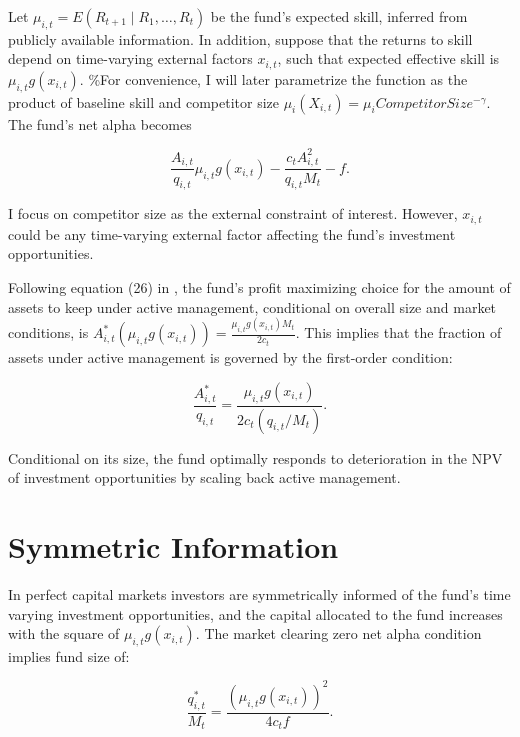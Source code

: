\documentclass[openany]{book}
\theoremstyle{definition}
\theoremstyle{definition}
\theoremstyle{definition}
\theoremstyle{remark}
\begin{document}
Let \(\mu_{i,t}=E(R_{t+1}\mid R_1,\ldots,R_t)\) be the fund's expected
skill, inferred from publicly available information. In addition,
suppose that the returns to skill depend on time-varying external
factors \(x_{i,t}\), such that expected effective skill is
\(\mu_{i,t}g(x_{i,t})\). \%For convenience, I will later parametrize the
function as the product of baseline skill and competitor size
\(\mu_i(X_{i,t})=\mu_i CompetitorSize^{-\gamma}\). The fund's net alpha
becomes

\begin{equation}
\frac{A_{i,t}}{q_{i,t}}\mu_{i,t}g(x_{i,t})-\frac{c_t A_{i,t}^2}{q_{i,t}M_t}-f. 
\end{equation}

I focus on competitor size as the external constraint of interest.
However, \(x_{i,t}\) could be any time-varying external factor affecting
the fund's investment opportunities.

Following equation (26) in \citet{bg04}, the fund's profit maximizing
choice for the amount of assets to keep under active management,
conditional on overall size and market conditions, is
\(A_{i,t}^\ast(\mu_{i,t}g(x_{i,t}))=\frac{\mu_{i,t}g(x_{i,t}) M_t}{2c_t}\).
This implies that the fraction of assets under active management is
governed by the first-order condition:

\begin{equation}
\frac{A_{i,t}^\ast}{q_{i,t}}=\frac{\mu_{i,t}g(x_{i,t})}{2c_t(q_{i,t}/M_t)}.
\label{eq:FOC}
\end{equation}

Conditional on its size, the fund optimally responds to deterioration in
the NPV of investment opportunities by scaling back active management.

\section{Symmetric Information}\label{symmetric-information}

In perfect capital markets investors are symmetrically informed of the
fund's time varying investment opportunities, and the capital allocated
to the fund increases with the square of \(\mu_{i,t}g(x_{i,t})\). The
market clearing zero net alpha condition implies fund size of:

\begin{equation}
\frac{q_{i,t}^\ast}{M_t}=\frac{(\mu_{i,t}g(x_{i,t}))^2}{4c_t f}.
\label{eq:zeroAlpha}
\end{equation}
\end{document}
